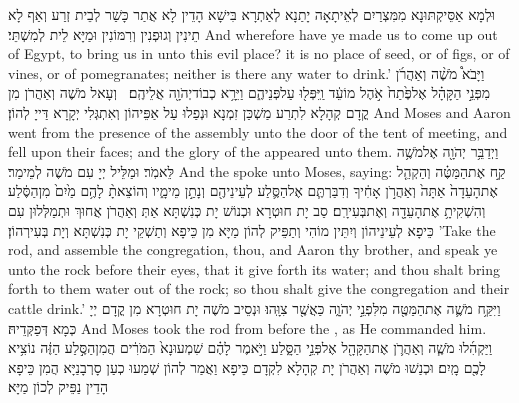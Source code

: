 {וּלְמָא אַסֵּיקְתּוּנָא מִמִּצְרַיִם לְאֵיתָאָה יָתַנָא לְאַתְרָא בִּישָׁא הָדֵין לָא אֲתַר כָּשַׁר לְבֵית זְרַע וְאַף לָא תֵינִין וְגוּפְנִין וְרִמּוֹנִין וּמַיָּא לֵית לְמִשְׁתֵּי׃}
{And wherefore have ye made us to come up out of Egypt, to bring us in unto this evil place? it is no place of seed, or of figs, or of vines, or of pomegranates; neither is there any water to drink.’}{}
{וַיָּבֹא֩ מֹשֶׁ֨ה וְאַהֲרֹ֜ן מִפְּנֵ֣י הַקָּהָ֗ל אֶל\maqqaf פֶּ֙תַח֙ אֹ֣הֶל מוֹעֵ֔ד וַֽיִּפְּל֖וּ עַל\maqqaf פְּנֵיהֶ֑ם וַיֵּרָ֥א כְבוֹד\maqqaf יְהֹוָ֖ה אֲלֵיהֶֽם׃ \petucha }
{וְעָאל מֹשֶׁה וְאַהֲרֹן מִן קֳדָם קְהָלָא לִתְרַע מַשְׁכַּן זִמְנָא וּנְפַלוּ עַל אַפֵּיהוֹן וְאִתְגְּלִי יְקָרָא דַּייָ לְהוֹן׃}
{And Moses and Aaron went from the presence of the assembly unto the door of the tent of meeting, and fell upon their faces; and the glory of the \lord\space appeared unto them.}{}
{וַיְדַבֵּ֥ר יְהֹוָ֖ה אֶל\maqqaf מֹשֶׁ֥ה לֵּאמֹֽר׃}
{וּמַלֵּיל יְיָ עִם מֹשֶׁה לְמֵימַר׃}
{And the \lord\space spoke unto Moses, saying:}{}
{קַ֣ח אֶת\maqqaf הַמַּטֶּ֗ה וְהַקְהֵ֤ל אֶת\maqqaf הָעֵדָה֙ אַתָּה֙ וְאַהֲרֹ֣ן אָחִ֔יךָ וְדִבַּרְתֶּ֧ם אֶל\maqqaf הַסֶּ֛לַע לְעֵינֵיהֶ֖ם וְנָתַ֣ן מֵימָ֑יו וְהוֹצֵאתָ֨ לָהֶ֥ם מַ֙יִם֙ מִן\maqqaf הַסֶּ֔לַע וְהִשְׁקִיתָ֥ אֶת\maqqaf הָעֵדָ֖ה וְאֶת\maqqaf בְּעִירָֽם׃}
{סַב יָת חוּטְרָא וּכְנוֹשׁ יָת כְּנִשְׁתָּא אַתְּ וְאַהֲרֹן אֲחוּךְ וּתְמַלְּלוּן עִם כֵּיפָא לְעֵינֵיהוֹן וְיִתֵּין מוֹהִי וְתַפֵּיק לְהוֹן מַיָּא מִן כֵּיפָא וְתַשְׁקֵי יָת כְּנִשְׁתָּא וְיָת בְּעִירְהוֹן׃}
{’Take the rod, and assemble the congregation, thou, and Aaron thy brother, and speak ye unto the rock before their eyes, that it give forth its water; and thou shalt bring forth to them water out of the rock; so thou shalt give the congregation and their cattle drink.’}{}
{וַיִּקַּ֥ח מֹשֶׁ֛ה אֶת\maqqaf הַמַּטֶּ֖ה מִלִּפְנֵ֣י יְהֹוָ֑ה כַּאֲשֶׁ֖ר צִוָּֽהוּ׃}
{וּנְסֵיב מֹשֶׁה יָת חוּטְרָא מִן קֳדָם יְיָ כְּמָא דְּפַקְּדֵיהּ׃}
{And Moses took the rod from before the \lord, as He commanded him.}{}
{וַיַּקְהִ֜לוּ מֹשֶׁ֧ה וְאַהֲרֹ֛ן אֶת\maqqaf הַקָּהָ֖ל אֶל\maqqaf פְּנֵ֣י הַסָּ֑לַע וַיֹּ֣אמֶר לָהֶ֗ם שִׁמְעוּ\maqqaf נָא֙ הַמֹּרִ֔ים הֲמִן\maqqaf הַסֶּ֣לַע הַזֶּ֔ה נוֹצִ֥יא לָכֶ֖ם מָֽיִם׃}
{וּכְנַשׁוּ מֹשֶׁה וְאַהֲרֹן יָת קְהָלָא לִקְדָם כֵּיפָא וַאֲמַר לְהוֹן שְׁמַעוּ כְעַן סָרְבָנַיָּא הֲמִן כֵּיפָא הָדֵין נַפֵּיק לְכוֹן מַיָּא׃}
